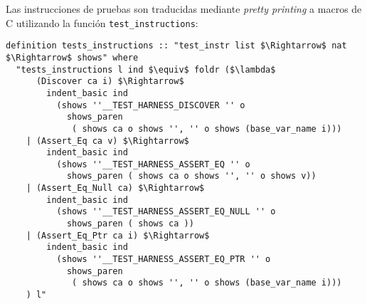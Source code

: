 \begin{comment}
\begin{figure}
\begin{lstlisting}[mathescape=true]
#include <stdlib.h>
#include <stdio.h>
#include <limits.h>
#include <inttypes.h>
#include "hashset.h"

hashset_t __test_harness_discovered;
int __test_harness_num_tests = 0;
int __test_harness_passed = 0;
int __test_harness_failed = 0;

#define __TEST_HARNESS_DISCOVER(addr, var)
  hashset_add(__test_harness_discovered, addr); var = addr;

#define __TEST_HARNESS_ASSERT_EQ(var, val)
  ++__test_harness_num_tests;
  (var != val) ? ++__test_harness_failed : ++__test_harness_passed;

#define __TEST_HARNESS_ASSERT_EQ_NULL(var)
  ++__test_harness_num_tests;
  (var != NULL) ? ++__test_harness_failed : ++__test_harness_passed;

#define __TEST_HARNESS_ASSERT_EQ_PTR(var, val)
  ++__test_harness_num_tests;
  (var != val) ? ++__test_harness_failed : ++__test_harness_passed;
\end{lstlisting}

\caption{Header file test\_harness.h}
\label{fig:header_test_harness}
\end{figure}
\end{comment}


Las instrucciones de pruebas son traducidas mediante \textit{pretty printing} a macros de C utilizando la función \verb|test_instructions|:

\begin{lstlisting}[mathescape=true, frame=single]
definition tests_instructions :: "test_instr list $\Rightarrow$ nat $\Rightarrow$ shows" where
  "tests_instructions l ind $\equiv$ foldr ($\lambda$
      (Discover ca i) $\Rightarrow$
        indent_basic ind
          (shows ''__TEST_HARNESS_DISCOVER '' o
            shows_paren
             ( shows ca o shows '', '' o shows (base_var_name i)))
    | (Assert_Eq ca v) $\Rightarrow$
        indent_basic ind
          (shows ''__TEST_HARNESS_ASSERT_EQ '' o
            shows_paren ( shows ca o shows '', '' o shows v))
    | (Assert_Eq_Null ca) $\Rightarrow$
        indent_basic ind
          (shows ''__TEST_HARNESS_ASSERT_EQ_NULL '' o
            shows_paren ( shows ca ))
    | (Assert_Eq_Ptr ca i) $\Rightarrow$
        indent_basic ind
          (shows ''__TEST_HARNESS_ASSERT_EQ_PTR '' o
            shows_paren
             ( shows ca o shows '', '' o shows (base_var_name i)))
    ) l"
\end{lstlisting}


